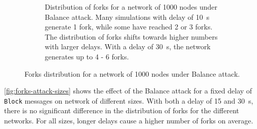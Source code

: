\begin{figure}[ht]
\begin{subfigure}{\textwidth}
		\vspace*{0.25cm}
		\caption{
			Distribution of forks for a network of \num{1000} nodes under Balance attack.
			Many simulations with delay of \SI{10}{\second} generate \num{1} fork, while some have reached \num{2} or \num{3} forks.
			The distribution of forks shifts towards higher numbers with larger delays.
			With a delay of \SI{30}{\second}, the network generates up to \num{4} - \num{6} forks.
		}
		\vspace*{0.25cm}
	\end{subfigure}
	\caption[Forks distribution for a network of 1000 nodes under Balance attack]{
		Forks distribution for a network of \num{1000} nodes under Balance attack.
	}
	\label{fig:forks-attack-delay-1000}
\end{figure}

\medskip
\cref{fig:forks-attack-sizes} shows the effect of the Balance attack for a fixed delay of \texttt{Block} messages on network of different sizes.
With both a delay of \num{15} and \SI{30}{\second}, there is no significant difference in the distribution of forks for the different networks.
For all sizes, longer delays cause a higher number of forks on average.

